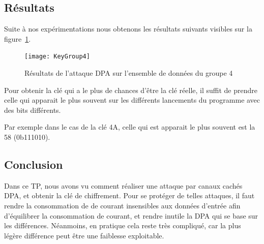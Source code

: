 \subsection{Résultats}

Suite à nos expérimentations nous obtenons les résultats suivants visibles
sur la figure~\ref{fig:resultsDPA}.

\begin{figure}[h!]
\texttt{[image: KeyGroup4]}
\caption{Résultats de l'attaque DPA sur l'ensemble de données du groupe 4}
\label{fig:resultsDPA}
\end{figure}

Pour obtenir la clé qui a le plus de chances d'être la clé réelle, il suffit 
de prendre celle qui apparait le plus souvent sur les différents lancements
du programme avec des bits différents.

Par exemple dans le cas de la clé 4A, celle qui est apparait le plus souvent est
la 58 (0b111010).

\subsection{Conclusion}

Dans ce TP, nous avons vu comment réaliser une attaque par canaux cachés DPA, et
obtenir la clé de chiffrement. Pour se protéger de telles attaques, il faut 
rendre la consommation de de courant insensibles aux données d'entrée afin
d'équilibrer la consommation de courant, et rendre inutile la DPA qui se base
sur les différences. Néanmoins, en pratique cela reste très compliqué, car la
plus légère différence peut être une faiblesse exploitable.
